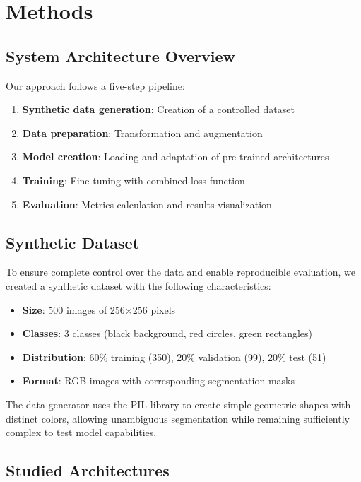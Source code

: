 \documentclass[12pt,a4paper]{article}
\begin{document}
\section{Methods}

\subsection{System Architecture Overview}

Our approach follows a five-step pipeline:
\begin{enumerate}
    \item \textbf{Synthetic data generation}: Creation of a controlled dataset
    \item \textbf{Data preparation}: Transformation and augmentation
    \item \textbf{Model creation}: Loading and adaptation of pre-trained architectures
    \item \textbf{Training}: Fine-tuning with combined loss function
    \item \textbf{Evaluation}: Metrics calculation and results visualization
\end{enumerate}

\subsection{Synthetic Dataset}

To ensure complete control over the data and enable reproducible evaluation, we created a synthetic dataset with the following characteristics:

\begin{itemize}
    \item \textbf{Size}: 500 images of 256×256 pixels
    \item \textbf{Classes}: 3 classes (black background, red circles, green rectangles)
    \item \textbf{Distribution}: 60\% training (350), 20\% validation (99), 20\% test (51)
    \item \textbf{Format}: RGB images with corresponding segmentation masks
\end{itemize}

The data generator uses the PIL library to create simple geometric shapes with distinct colors, allowing unambiguous segmentation while remaining sufficiently complex to test model capabilities.

\subsection{Studied Architectures}
\end{document}
